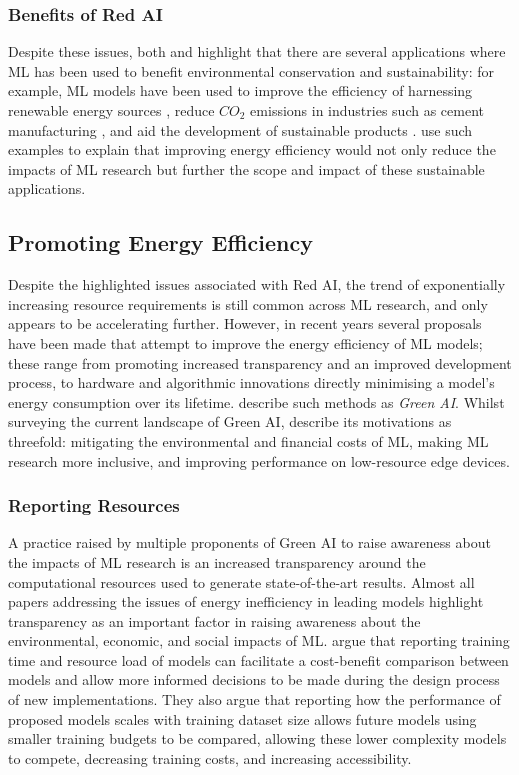 \documentclass[a4paper, 12pt]{article}
\begin{document}
    \subsubsection{Benefits of Red AI}

    Despite these issues, both  and  highlight that there are several applications where ML has been used to benefit environmental conservation and sustainability: for example, ML models have been used to improve the efficiency of harnessing renewable energy sources \cite{daniel-2021}, reduce $CO_2$ emissions in industries such as cement manufacturing \cite{acharyya-2019}, and aid the development of sustainable products \cite{marwah-2011}.  use such examples to explain that improving energy efficiency would not only reduce the impacts of ML research but further the scope and impact of these sustainable applications.


    \subsection{Promoting Energy Efficiency}

    Despite the highlighted issues associated with Red AI, the trend of exponentially increasing resource requirements is still common across ML research, and only appears to be accelerating further. However, in recent years several proposals have been made that attempt to improve the energy efficiency of ML models; these range from promoting increased transparency and an improved development process, to hardware and algorithmic innovations directly minimising a model's energy consumption over its lifetime.  describe such methods as \emph{Green AI}. Whilst surveying the current landscape of Green AI,  describe its motivations as threefold: mitigating the environmental and financial costs of ML, making ML research more inclusive, and improving performance on low-resource edge devices.

    \subsubsection{Reporting Resources}

    A practice raised by multiple proponents of Green AI to raise awareness about the impacts of ML research is an increased transparency around the computational resources used to generate state-of-the-art results. Almost all papers addressing the issues of energy inefficiency in leading models highlight transparency as an important factor in raising awareness about the environmental, economic, and social impacts of ML.  argue that reporting training time and resource load of models can facilitate a cost-benefit comparison between models and allow more informed decisions to be made during the design process of new implementations. They also argue that reporting how the performance of proposed models scales with training dataset size allows future models using smaller training budgets to be compared, allowing these lower complexity models to compete, decreasing training costs, and increasing accessibility.
\end{document}

